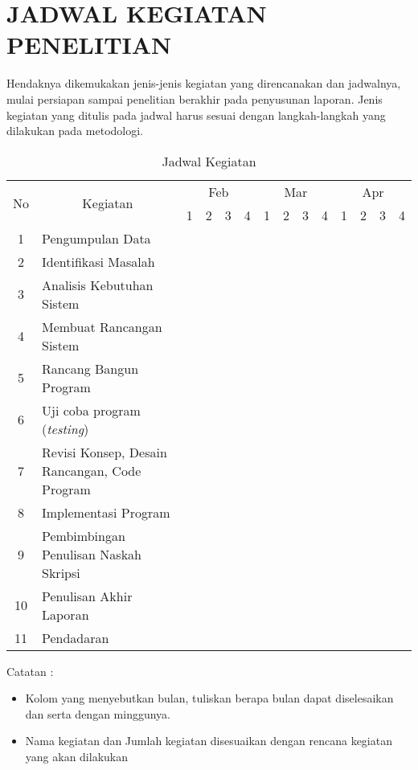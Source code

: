\chapter*{JADWAL KEGIATAN PENELITIAN}
Hendaknya   dikemukakan   jenis-jenis   kegiatan   yang   direncanakan   dan    jadwalnya, mulai persiapan sampai penelitian berakhir pada penyusunan laporan. Jenis
kegiatan yang ditulis pada jadwal harus sesuai dengan langkah-langkah yang dilakukan pada metodologi.


\begin{table}[!ht]
\caption{Jadwal Kegiatan}
\label{tab:jadwal-kegiatan}
\begin{tabular}{|c|m{5cm}|p{.2cm}|p{.2cm}|p{.2cm}|p{.2cm}|p{.2cm}|p{.2cm}|p{.2cm}|p{.2cm}|p{.2cm}|p{.2cm}|p{.2cm}|p{.2cm}|}
\hline
\multirow{2}{*}{No}	& 
\multicolumn{1}{c|}{\multirow{2}{*}{Kegiatan}}	& 
\multicolumn{4}{c|}{Feb} & 
\multicolumn{4}{c|}{Mar} &
\multicolumn{4}{c|}{Apr} \\ \cline{3-14}
& & 
\multicolumn{1}{c|}{1} &
\multicolumn{1}{c|}{2} &
\multicolumn{1}{c|}{3} &
\multicolumn{1}{c|}{4} &
\multicolumn{1}{c|}{1} &
\multicolumn{1}{c|}{2} &
\multicolumn{1}{c|}{3} &
\multicolumn{1}{c|}{4} &
\multicolumn{1}{c|}{1} &
\multicolumn{1}{c|}{2} &
\multicolumn{1}{c|}{3} &
\multicolumn{1}{c|}{4} \\ \hline
1  & Pengumpulan Data 			& \cellcolor{gray!75} & \cellcolor{gray!75} & & & & & & & & & & \\ \hline
2  & Identifikasi Masalah 		& & & \cellcolor{gray!75} & & & & & & & & & \\ \hline
3  & Analisis Kebutuhan Sistem 	& & \cellcolor{gray!75} & \cellcolor{gray!75} & \cellcolor{gray!75} & & & & & & & & \\ \hline
4  & Membuat Rancangan Sistem 	& & & & \cellcolor{gray!75} & \cellcolor{gray!75} & & & & & & & \\ \hline
5  & Rancang Bangun Program 	& & & & & & \cellcolor{gray!75} & \cellcolor{gray!75} & \cellcolor{gray!75} & & & & \\ \hline
6  & Uji coba program (\textit{testing}) 			& & & & & & & & \cellcolor{gray!75} & \cellcolor{gray!75} & & & \\ \hline
7  & Revisi Konsep, Desain Rancangan, Code Program & & & & & & & & & \cellcolor{gray!75} & \cellcolor{gray!75} & & \\ \hline
8  & Implementasi Program 					& & & & & & & & & & & \cellcolor{gray!75} & \\ \hline
9  & Pembimbingan Penulisan Naskah Skripsi & & & & & \cellcolor{gray!75} & \cellcolor{gray!75} & \cellcolor{gray!75} & \cellcolor{gray!75} & \cellcolor{gray!75} & & & \\ \hline
10 & Penulisan Akhir Laporan 				& & & & & & & & & & \cellcolor{gray!75} & & \\ \hline
11 & Pendadaran 							& & & & & & & & & & & & \cellcolor{gray!75} \\ \hline
\end{tabular}
\end{table}

Catatan : 
\begin{itemize}
\item Kolom yang menyebutkan bulan, tuliskan berapa bulan dapat diselesaikan dan serta dengan minggunya.
\item Nama kegiatan dan Jumlah kegiatan disesuaikan dengan rencana kegiatan yang akan dilakukan
\end{itemize}